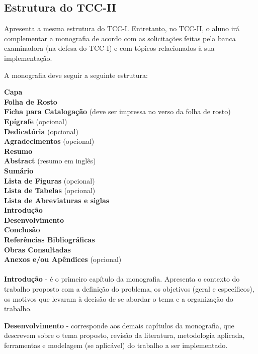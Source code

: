 \subsection{Estrutura do TCC-II}

Apresenta a mesma estrutura do TCC-I. Entretanto, no TCC-II, o aluno irá complementar a monografia de acordo com as solicitações feitas pela banca examinadora (na defesa do TCC-I) e com tópicos relacionados à sua implementação. 

A monografia deve seguir a seguinte estrutura: 

	\indent \textbf{Capa} \\
	\indent \textbf{Folha de Rosto} \\
	\indent \textbf{Ficha para Catalogação} (deve ser impressa no verso da folha de rosto) \\
	\indent \textbf{Epígrafe} (opcional) \\
	\indent \textbf{Dedicatória} (opcional) \\
	\indent \textbf{Agradecimentos} (opcional) \\
	\indent \textbf{Resumo} \\
	\indent \textbf{Abstract} (resumo em inglês) \\
	\indent \textbf{Sumário} \\
	\indent \textbf{Lista de Figuras} (opcional) \\
	\indent \textbf{Lista de Tabelas} (opcional) \\
	\indent \textbf{Lista de Abreviaturas e siglas} \\
	\indent \textbf{Introdução} \\
	\indent \textbf{Desenvolvimento} \\
	\indent \textbf{Conclusão} \\
	\indent \textbf{Referências Bibliográficas} \\
	\indent \textbf{Obras Consultadas} \\
	\indent \textbf{Anexos e/ou Apêndices} (opcional) \\\\


\textbf{Introdução} - \'e o primeiro capítulo da monografia. Apresenta o contexto do trabalho proposto com a definição do problema, os objetivos (geral e específicos), os motivos que levaram à decisão de se abordar o tema e a organização do trabalho.

\textbf{Desenvolvimento} - corresponde aos demais capítulos da monografia, que descrevem sobre o tema proposto, revisão da literatura, metodologia aplicada, ferramentas e modelagem (se aplicável) do trabalho a ser implementado.

